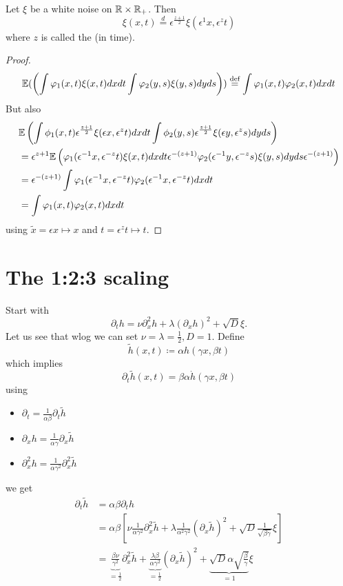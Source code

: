 \begin{lemma}\label{lem:5.4}
    Let $\xi$ be a white noise on $\mathbb{R}\times\mathbb{R}_+$. Then 
    \[\xi(x,t)\stackrel{d}{=}\epsilon^{\frac{z+1}{2}}\xi(\epsilon^{1}x,\epsilon^{z}t)\]
    where $z$ is called the  (in time).
\end{lemma}

\begin{proof}
    \begin{align*}
        \mathbb{E}(\left(\int \varphi_1(x,t)\xi(x,t)dxdt\int \varphi_2(y,s)\xi(y,s)dyds\right))\stackrel{\text{def}}{=}\int \varphi_1(x,t)\varphi_2(x,t)dxdt 
    \end{align*}
    But also
    \begin{align*}
        &\mathbb{E}\left(\int \phi_1(x,t)\epsilon^{\frac{z+1}{2}}\xi(\epsilon x,\epsilon^z t)dxdt\int \phi_2(y,s)\epsilon^{\frac{z+1}{2}}\xi(\epsilon y,\epsilon^z s)dyds  \right)\\
        &=\epsilon^{z+1}\mathbb{E}\left(\varphi_1(\epsilon^{-1}x,\epsilon^{-z}t)\xi(x,t)dxdt\epsilon^{-(z+1)}\varphi_2(\epsilon^{-1}y,\epsilon^{-z}s)\xi(y,s)dyds\epsilon^{-(z+1)}\right)\\
        &=\epsilon^{-(z+1)}\int\varphi_1(\epsilon^{-1}x,\epsilon^{-z}t)\varphi_2(\epsilon^{-1}x,\epsilon^{-z}t)dxdt\\
        &=\int\varphi_1(x,t)\varphi_2(x,t)dxdt
    \end{align*}
    using $\tilde{x}=\epsilon x \mapsto x$ and $t=\epsilon^zt\mapsto t$.
\end{proof}

\section{The 1:2:3 scaling}
Start with \[\partial_t h =\nu\partial_x^2h+\lambda(\partial_x h)^2+ \sqrt{D}\xi.\]
Let us see that wlog we can set $\nu=\lambda=\frac{1}{2},D=1$. Define 
\[\tilde{h}(x,t)\coloneqq \alpha h(\gamma x,\beta t)\]
which implies 
\[\partial_t \tilde{h}(x,t)=\beta \alpha\dot{h}(\gamma x,\beta t)\]
using
\begin{itemize}
    \item $\partial_t  = \frac{1}{\alpha\beta}\partial_t \tilde{h}$
    \item $\partial_x h = \frac{1}{\alpha\gamma}\partial_x\tilde{h}$
    \item $\partial_x^2 h = \frac{1}{\alpha\gamma^2}\partial_x^2\tilde{h}$
\end{itemize}
we get 
\begin{align*}
    \partial_t \tilde{h} &= \alpha\beta\partial_t h \\
    &=\alpha\beta\left[\nu\frac{1}{\alpha\gamma^2}\partial_x^2\tilde{h}+\lambda\frac{1}{\alpha^2\gamma^2}(\partial_x \tilde{h})^2 +\sqrt{D}\frac{1}{\sqrt{\beta\gamma}}\xi\right]\\
    &=\underbrace{\frac{\beta \nu}{\gamma^2}}_{=\frac{1}{2}}\partial_x^2\tilde{h}+\underbrace{\frac{\lambda\beta}{\alpha\gamma^2}}_{=\frac{1}{2}}(\partial_x \tilde{h})^2+\underbrace{\sqrt{D}\alpha\sqrt{\frac{\beta}{\gamma}}}_{=1}\xi 
\end{align*}


